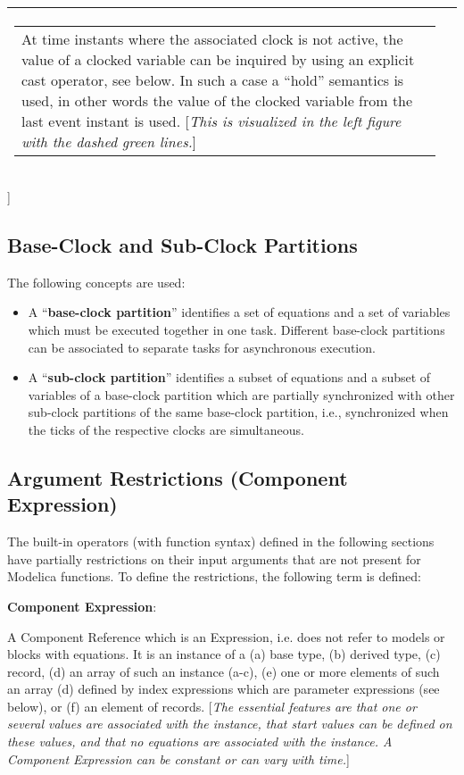 \begin{longtable}[]{|p{7.3cm}|p{7.3cm}|}
\begin{tabular}{p{7cm}}
At time instants where the associated clock is not active, the value of
a clocked variable can be inquired by using an explicit cast operator,
see below. In such a case a ``hold'' semantics is used, in other words
the value of the clocked variable from the last event instant is used.
{[}\emph{This is visualized in the left figure with the dashed green
lines.}{]}\end{tabular}\\ \hline
\end{longtable}

{]}

\subsection{Base-Clock and Sub-Clock Partitions}

The following concepts are used:

\begin{itemize}
\item
  A ``\textbf{base-clock partition}'' identifies a set of equations and
  a set of variables which must be executed together in one task.
  Different base-clock partitions can be associated to separate tasks
  for asynchronous execution.
\item
  A ``\textbf{sub-clock partition}'' identifies a subset of equations
  and a subset of variables of a base-clock partition which are
  partially synchronized with other sub-clock partitions of the same
  base-clock partition, i.e., synchronized when the ticks of the
  respective clocks are simultaneous.
\end{itemize}

\subsection{Argument Restrictions (Component Expression)}

The built-in operators (with function syntax) defined in the following
sections have partially restrictions on their input arguments that are
not present for Modelica functions. To define the restrictions, the
following term is defined:

\begin{description}
\item{\textbf{Component Expression}:}

A Component Reference which is an Expression, i.e. does not refer to
models or blocks with equations. It is an instance of a (a) base type,
(b) derived type, (c) record, (d) an array of such an instance (a-c),
(e) one or more elements of such an array (d) defined by index
expressions which are parameter expressions (see below), or (f) an
element of records. {[}\emph{The essential features are that one or
several values are associated with the instance, that start values can
be defined on these values, and that no equations are associated with
the instance. A Component Expression can be constant or can vary with
time.}{]}
\end{description}

